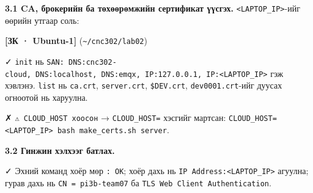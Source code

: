 \textbf{3.1 CA, брокерийн ба төхөөрөмжийн сертификат үүсгэх.} \texttt{\textless{}LAPTOP\_\allowbreak{}IP\textgreater{}}-ийг өөрийн утгаар соль:

\textbf{{[}ЗК · Ubuntu-1{]}} (\texttt{\textasciitilde{}/cnc302/lab02})

\begin{Shaded}
\begin{Highlighting}[]
\OperatorTok{\textless{}}\OperatorTok{\textgreater{}}
\end{Highlighting}
\end{Shaded}

✓ \texttt{init} нь \texttt{SAN:\allowbreak{}\ DNS:\allowbreak{}cnc302-cloud,\ DNS:\allowbreak{}localhost,\ DNS:\allowbreak{}emqx,\ IP:\allowbreak{}127.\allowbreak{}0.\allowbreak{}0.\allowbreak{}1,\ IP:\allowbreak{}\textless{}LAPTOP\_\allowbreak{}IP\textgreater{}} гэж хэвлэнэ. \texttt{list} нь \texttt{ca.crt}, \texttt{server.crt}, \texttt{\$DEV.crt}, \texttt{dev0001.crt}-ийг дуусах огноотой нь харуулна.

✗ \texttt{⚠\ CLOUD\_\allowbreak{}HOST\ хоосон} → \texttt{CLOUD\_HOST=} хэсгийг мартсан: \texttt{CLOUD\_\allowbreak{}HOST=\allowbreak{}\textless{}LAPTOP\_\allowbreak{}IP\textgreater{}\ bash\ make\_\allowbreak{}certs.\allowbreak{}sh\ server}.

\textbf{3.2 Гинжин хэлхээг батлах.}

\begin{Shaded}
\begin{Highlighting}[]
\end{Highlighting}
\end{Shaded}

✓ Эхний команд хоёр мөр \texttt{:\ OK}; хоёр дахь нь \texttt{IP\ Address:\allowbreak{}\textless{}LAPTOP\_\allowbreak{}IP\textgreater{}} агуулна; гурав дахь нь \texttt{CN\ =\allowbreak{}\ pi3b-team07} ба \texttt{TLS\ Web\ Client\ Authentication}.


